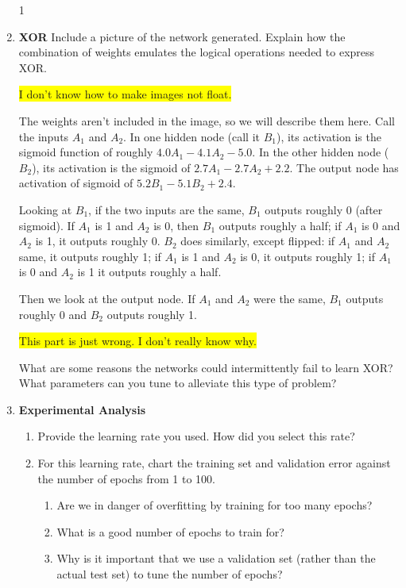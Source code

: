 \documentclass{article}
\newcommand{\edit}[1]{\colorbox{Yellow}{#1}}
\begin{document}
\begin{enumerate}
1
\item \textbf{XOR}
Include a picture of the network generated. Explain how the combination of weights
emulates the logical operations needed to express XOR. 

\edit{I don't know how to make images not float.}

The weights aren't included in the image, so we will describe them here.
Call the inputs $A_1$ and $A_2$. 
In one hidden node (call it $B_1$), its activation is the sigmoid function
of roughly $4.0 A_1-4.1 A_2-5.0$. In the other hidden node ($B_2$), its activation
is the sigmoid of $2.7A_1-2.7A_2+2.2$. The output node has activation of
sigmoid of $5.2 B_1-5.1 B_2+2.4$. 

Looking at $B_1$, if the two inputs are the same, $B_1$ outputs 
roughly 0 (after sigmoid). If $A_1$ is 1 and $A_2$ is 0, then $B_1$ outputs roughly a half;
if $A_1$ is 0 and $A_2$ is 1, it outputs roughly 0. 
$B_2$ does similarly, except flipped: if $A_1$ and $A_2$ same, it
outputs roughly 1; if $A_1$ is 1 and $A_2$ is 0, it outputs roughly 1;
if $A_1$ is 0 and $A_2$ is 1 it outputs roughly a half. 

Then we look at the output node. If $A_1$ and $A_2$ were the same, 
$B_1$ outputs roughly 0 and $B_2$ outputs roughly 1. 

\edit{This part is just wrong. I don't really know why.}

What are some reasons the networks could intermittently fail to learn XOR?
What parameters can you tune to alleviate this type of problem?



\item \textbf{Experimental Analysis}
\begin{enumerate}
\item Provide the learning rate you used. How did you select this rate?

\item For this learning rate, chart the training set and validation error
against the number of epochs from 1 to 100. 

\begin{enumerate}
\item Are we in danger of overfitting by training for too many epochs?


\item What is a good number of epochs to train for?


\item Why is it important that we use a validation set (rather than the
actual test set) to tune the number of epochs?


\end{enumerate}
\end{enumerate}
\end{enumerate}
\end{document}
